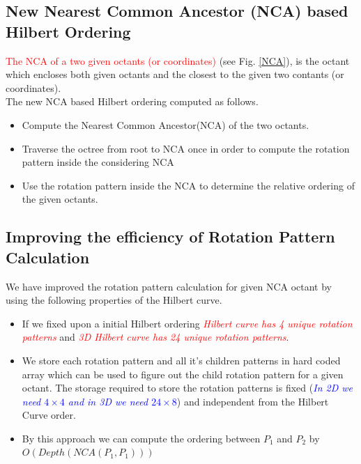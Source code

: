 \documentclass[a0,landscape]{a0poster}
\begin{document}
\begin{multicols}{4}

\subsection*{New Nearest Common Ancestor (NCA) based Hilbert Ordering}


\textcolor{red}{The NCA of a two given octants (or coordinates)} (see Fig. \ref{NCA}), is the octant which encloses both given octants and the closest to the given two contants (or coordinates). \\
\color{orange}
The new NCA based Hilbert ordering computed as
follows. 
\begin{itemize}
 \item Compute the Nearest Common Ancestor(NCA) of the two octants.
 \item Traverse the octree from root to NCA once in order to compute the rotation pattern inside the considering NCA
 \item Use the rotation pattern inside the NCA to determine the relative ordering of the given octants.
\end{itemize}

\color{DarkSlateGray}
\subsection*{Improving the efficiency of Rotation Pattern Calculation}
We have improved the rotation pattern calculation for given NCA octant by using the following properties of the Hilbert curve.
\begin{itemize}
 \item If we fixed upon a initial Hilbert ordering \textit{\textcolor{red}{ Hilbert curve has 4 unique rotation patterns}} and \textit{\textcolor{red}{3D Hilbert curve has 24 unique rotation patterns}}.
 \item We store each rotation pattern and all it's children patterns in hard coded array which can be used to figure out the child rotation pattern for a given octant. The storage required to store the rotation patterns is fixed (\textit{\textcolor{blue}{In 2D we need $4\times4$  and in 3D we need $24\times8$}}) and independent from the Hilbert Curve order.
 \item By this approach we can compute the ordering between $P_1$ and $P_2$ by $O(Depth(NCA(P_1,P_1)))$
\end{itemize}


\end{multicols}
\end{document}
